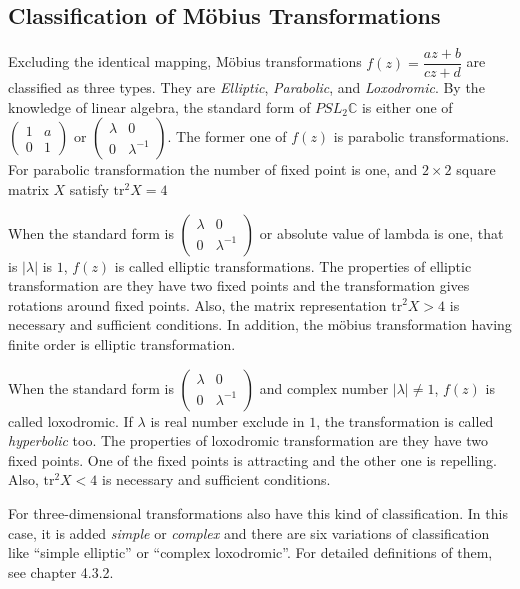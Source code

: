 \subsection{Classification of M\"obius Transformations}

Excluding the identical mapping, M\"obius transformations
$f(z) = \dfrac{az + b}{cz + d}$ are classified as three types.
They are \textit{Elliptic}, \textit{Parabolic}, and \textit{Loxodromic}.
By the knowledge of linear algebra, the standard form of $PSL_2\mathbb{C}$
is either one of $\begin{pmatrix}1 & a \\ 0 & 1 \end{pmatrix}$ or
$\begin{pmatrix}\lambda & 0 \\ 0 & \lambda^{-1} \end{pmatrix}$.
The former one of $f(z)$ is parabolic transformations.
For parabolic transformation the number of fixed point is one, and
$2 \times 2$ square matrix $X$ satisfy $\mathrm{tr}^2X = 4$

When the standard form is
$\begin{pmatrix}\lambda & 0 \\ 0 & \lambda^{-1} \end{pmatrix}$
or absolute value of lambda is one, that is  $|\lambda|$ is $1$, 
$f(z)$ is called elliptic transformations.
The properties of elliptic transformation are they have
two fixed points and the transformation gives rotations around fixed
points.
Also, the matrix representation $\mathrm{tr}^2X > 4$ is 
necessary and sufficient conditions.
In addition, the m\"obius transformation having finite order
is elliptic transformation.

When the standard form is
$\begin{pmatrix}\lambda & 0 \\ 0 & \lambda^{-1} \end{pmatrix}$
and complex number $|\lambda| \neq 1$, $f(z)$ is called loxodromic.
If $\lambda$ is real number exclude in $1$, the transformation is called
\textit{hyperbolic} too.
The properties of loxodromic transformation are they have two fixed
points. One of the fixed points is attracting and the other one is repelling.
Also, $\mathrm{tr}^2X < 4$ is necessary and sufficient conditions.

For three-dimensional transformations also have this kind of
classification.
In this case, it is added \textit{simple} or \textit{complex} and
there are six variations of classification like ``simple elliptic'' or
``complex loxodromic''.
For detailed definitions of them, see chapter 4.3.2.

